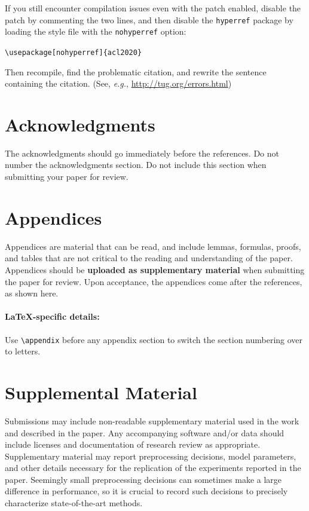 \documentclass[11pt,a4paper]{article}
\begin{document}
If you still encounter compilation issues even with the patch enabled, disable the patch by commenting the two lines, and then disable the \texttt{\small hyperref} package by loading the style file with the \texttt{\small nohyperref} option:

\noindent
{\small\verb|\usepackage[nohyperref]{acl2020}|}

\noindent
Then recompile, find the problematic citation, and rewrite the sentence containing the citation. (See, {\em e.g.}, \url{http://tug.org/errors.html})

\section*{Acknowledgments}

The acknowledgments should go immediately before the references. Do not number the acknowledgments section.
Do not include this section when submitting your paper for review.




\appendix

\section{Appendices}
\label{sec:appendix}
Appendices are material that can be read, and include lemmas, formulas, proofs, and tables that are not critical to the reading and understanding of the paper. 
Appendices should be \textbf{uploaded as supplementary material} when submitting the paper for review.
Upon acceptance, the appendices come after the references, as shown here.

\paragraph{\LaTeX-specific details:}
Use {\small\verb|\appendix|} before any appendix section to switch the section numbering over to letters.


\section{Supplemental Material}
\label{sec:supplemental}
Submissions may include non-readable supplementary material used in the work and described in the paper.
Any accompanying software and/or data should include licenses and documentation of research review as appropriate.
Supplementary material may report preprocessing decisions, model parameters, and other details necessary for the replication of the experiments reported in the paper.
Seemingly small preprocessing decisions can sometimes make a large difference in performance, so it is crucial to record such decisions to precisely characterize state-of-the-art methods. 
\end{document}
